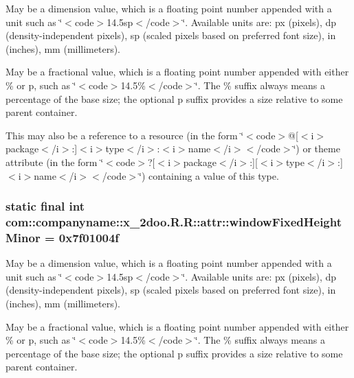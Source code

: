 May be a dimension value, which is a floating point number appended with a unit such as \char`\"{}$<$code$>$14.5sp$<$/code$>$\char`\"{}. Available units are: px (pixels), dp (density-independent pixels), sp (scaled pixels based on preferred font size), in (inches), mm (millimeters). 

May be a fractional value, which is a floating point number appended with either \% or p, such as \char`\"{}$<$code$>$14.5\%$<$/code$>$\char`\"{}. The \% suffix always means a percentage of the base size; the optional p suffix provides a size relative to some parent container. 

This may also be a reference to a resource (in the form \char`\"{}$<$code$>$@\mbox{[}$<$i$>$package$<$/i$>$:\mbox{]}$<$i$>$type$<$/i$>$:$<$i$>$name$<$/i$>$$<$/code$>$\char`\"{}) or theme attribute (in the form \char`\"{}$<$code$>$?\mbox{[}$<$i$>$package$<$/i$>$:\mbox{]}\mbox{[}$<$i$>$type$<$/i$>$:\mbox{]}$<$i$>$name$<$/i$>$$<$/code$>$\char`\"{}) containing a value of this type. \hypertarget{classcom_1_1companyname_1_1x__2doo_1_1_r_1_1attr_40bfbc676b211e152760343d6c10e4ff}{
\subsubsection[{windowFixedHeightMinor}]{\setlength{\rightskip}{0pt plus 5cm}static final int com::companyname::x\_\-2doo.R.R::attr::windowFixedHeightMinor = 0x7f01004f}}
\label{classcom_1_1companyname_1_1x__2doo_1_1_r_1_1attr_40bfbc676b211e152760343d6c10e4ff}


May be a dimension value, which is a floating point number appended with a unit such as \char`\"{}$<$code$>$14.5sp$<$/code$>$\char`\"{}. Available units are: px (pixels), dp (density-independent pixels), sp (scaled pixels based on preferred font size), in (inches), mm (millimeters). 

May be a fractional value, which is a floating point number appended with either \% or p, such as \char`\"{}$<$code$>$14.5\%$<$/code$>$\char`\"{}. The \% suffix always means a percentage of the base size; the optional p suffix provides a size relative to some parent container. 

